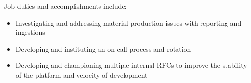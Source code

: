 \normalsize
Job duties and accomplishments include:
\small
\begin{itemize}
    \item Investigating and addressing material production issues with reporting and ingestions
    \item Developing and instituting an on-call process and rotation
    \item Developing and championing multiple internal RFCs to improve the stability of the platform and velocity of development
\end{itemize}
\normalsize
\medskip
